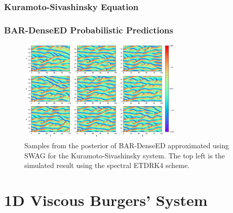 \documentclass{beamer}
\theoremstyle{remark}
\begin{document}
\begin{frame}
\frametitle{Kuramoto-Sivashinsky Equation}

\begin{table}[H]
    \caption{Wall-clock time for both spectral ETDRK4 scheme and AR-DenseED to simulate $5000$ time-steps of the Kuramoto-Sivashinsky system.
    Wall-clock time estimates were obtained by averaging $10$ independent simulation run times.}
    \label{tab:ks-wallclock}
\end{table}

\end{frame}

\begin{frame}
\frametitle{BAR-DenseED Probabilistic Predictions}
\begin{figure}[H]
    \centering
    \includegraphics[width=0.7\textwidth]{Fig08.png}
    \caption{Samples from the posterior of BAR-DenseED approximated using SWAG for the Kuramoto-Sivashinsky system. The top left is the simulated result using the spectral ETDRK4 scheme.} 
    \label{fig:ks-bar-samples}
\end{figure}
\end{frame}


\section{1D Viscous Burgers' System}
\end{document}

